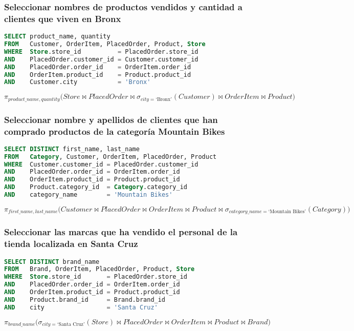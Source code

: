 \subsubsection{Seleccionar nombres de productos vendidos y cantidad a clientes que viven en Bronx}

\begin{lstlisting}[language=SQL]
SELECT product_name, quantity
FROM   Customer, OrderItem, PlacedOrder, Product, Store
WHERE  Store.store_id          = PlacedOrder.store_id
AND    PlacedOrder.customer_id = Customer.customer_id
AND    PlacedOrder.order_id    = OrderItem.order_id
AND    OrderItem.product_id    = Product.product_id
AND    Customer.city           = 'Bronx'
\end{lstlisting}

\[\pi_{product\_name,quantity}\big(Store\bowtie PlacedOrder\bowtie\sigma_{city=\text{`Bronx'}}(Customer)\bowtie OrderItem\bowtie Product\big)\]

\subsubsection{Seleccionar nombre y apellidos de clientes que han comprado productos de la categoría Mountain Bikes}

\begin{lstlisting}[language=SQL]
SELECT DISTINCT first_name, last_name
FROM   Category, Customer, OrderItem, PlacedOrder, Product
WHERE  Customer.customer_id = PlacedOrder.customer_id
AND    PlacedOrder.order_id = OrderItem.order_id
AND    OrderItem.product_id = Product.product_id
AND    Product.category_id  = Category.category_id
AND    category_name        = 'Mountain Bikes'
\end{lstlisting}

\[\pi_{first\_name,last\_name}\big(Customer\bowtie PlacedOrder\bowtie OrderItem\bowtie Product\bowtie\sigma_{category\_name=\text{`Mountain Bikes'}}(Category)\big)\]

\subsubsection{Seleccionar las marcas que ha vendido el personal de la tienda localizada en Santa Cruz}

\begin{lstlisting}[language=SQL]
SELECT DISTINCT brand_name
FROM   Brand, OrderItem, PlacedOrder, Product, Store
WHERE  Store.store_id       = PlacedOrder.store_id
AND    PlacedOrder.order_id = OrderItem.order_id
AND    OrderItem.product_id = Product.product_id
AND    Product.brand_id     = Brand.brand_id
AND    city                 = 'Santa Cruz'
\end{lstlisting}

\[\pi_{brand\_name}\big(\sigma_{city=\text{`Santa Cruz'}}(Store)\bowtie PlacedOrder\bowtie OrderItem\bowtie Product\bowtie Brand\big)\]
